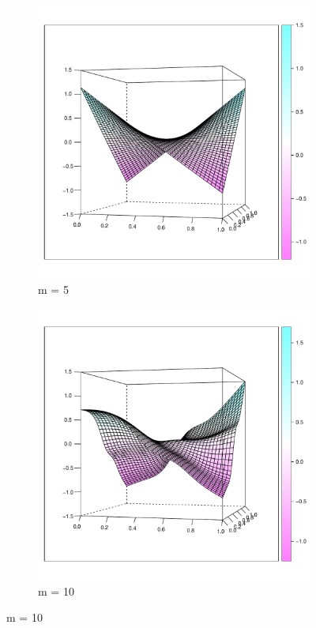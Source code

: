  \begin{figure}
 	\centering   
        \begin{subfigure}[b]{0.40\textwidth}
                \centering
                \includegraphics[width=\textwidth]{Images-nonparametric/cy-fit-wireframe-m5.pdf}
                \caption{m = 5}
                \label{}
        \end{subfigure}%
        \begin{subfigure}[b]{0.40\textwidth}
                \centering
                \includegraphics[width=\textwidth]{Images-nonparametric/cy-fit-wireframe-m10.pdf}
                \caption{m = 10}
                \label{}
        \end{subfigure}


\end{figure}
